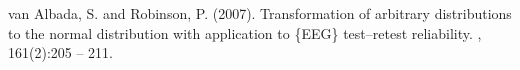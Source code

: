 \documentclass[11pt]{article}
\begin{document}
\begin{thebibliography}{}

van Albada, S. and Robinson, P. (2007).
\newblock Transformation of arbitrary distributions to the normal distribution
  with application to \{EEG\} test--retest reliability.
, 161(2):205 -- 211.

\end{thebibliography}
\end{document}
